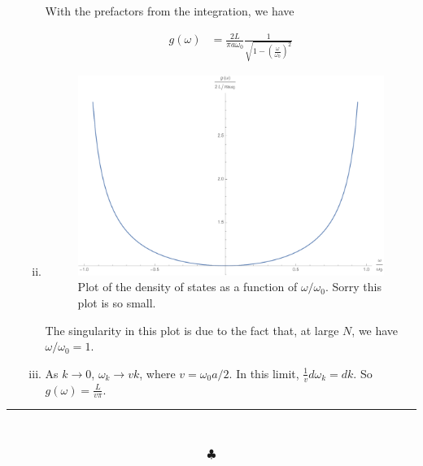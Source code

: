 \documentclass[]{article}
\begin{document}
\begin{enumerate}[1.]
\begin{enumerate}[i.]
With the prefactors from the integration, we have

\begin{equation}
\begin{split}
g(\omega) & = \frac{2L}{\pi a \omega_0} \frac{1 }{ \sqrt{1  -  \left( \frac{\omega }{\omega_0} \right)^2}  }
\end{split}
\end{equation}

\item 

\begin{frame}{}
    \begin{figure}[h]
        \begin{minipage}[b]{0.5\linewidth}
            \centering
            \includegraphics[width=\textwidth]{1D_osc_Dos.pdf}
        \end{minipage}
        \caption{Plot of the density of states as a function of $\omega/\omega_0$. Sorry this plot is so small. }
    \end{figure}
\end{frame}

The singularity in this plot is due to the fact that, at large $N$, we have $\omega/\omega_0 = 1$. 


\item As $k\to 0$, $ \omega_k \to vk$, where $v = \omega_0 a/2$. In this limit, $\frac{1}{v}d\omega_k =  dk$. So $g(\omega) = \frac{L}{v\pi}$.

\end{enumerate}

\end{enumerate}



\begin{center}
\noindent\rule{15cm}{0.4pt} \\
\end{center}
$$\clubsuit$$
\end{document}
